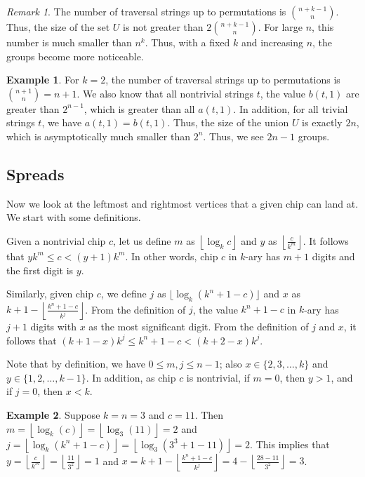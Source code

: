 \documentclass[11pt]{article}
\theoremstyle{definition}
\newtheorem{example}{Example}
\theoremstyle{remark}
\newtheorem*{remark}{Remark} %
\newcommand{\floor}[1]{\left\lfloor #1 \right\rfloor}
\begin{document}
\begin{remark}
The number of traversal strings up to permutations is $\binom{n+k-1}{n}$. Thus, the size of the set $U$ is not greater than $2\binom{n+k - 1}{n}$. For large $n$, this number is much smaller than $n^k$. Thus, with a fixed $k$ and increasing $n$, the groups become more noticeable.
\end{remark}

\begin{example}
    For $k=2$, the number of traversal strings up to permutations is $\binom{n+1}{n} = n+1$. We also know that all nontrivial strings $t$, the value $b(t,1)$ are greater than $2^{n-1}$, which is greater than all $a(t,1)$. In addition, for all trivial strings $t$, we have $a(t,1)= b(t,1)$. Thus, the size of the union $U$ is exactly $2n$, which is asymptotically much smaller than $2^n$. Thus, we see $2n-1$ groups.
\end{example}


\subsection{Spreads}
\label{sec:spreads}

Now we look at the leftmost and rightmost vertices that a given chip can land at. We start with some definitions. 

Given a nontrivial chip $c$, let us define $m$ as $\floor{\log_k c}$ and $y$ as $\floor{\frac{c}{k^m}}$. It follows that $yk^m \leq c < (y+1)k^m$. In other words, chip $c$ in $k$-ary has $m+1$ digits and the first digit is $y$.
 
Similarly, given chip $c$, we define $j$ as $\lfloor \log_k(k^n+1-c)\rfloor$ and $x$ as $k+1 - \floor{\frac{k^n+1-c}{k^j}}$. From the definition of $j$, the value $ k^n+1-c$ in $k$-ary has $j+1$ digits with $x$ as the most significant digit. From the definition of $j$ and $x$, it follows that $(k +1 - x) k^j\leq k^n+1-c < (k+2 - x)k^j$.

Note that by definition, we have $0 \leq m, j \leq n-1$; also $x \in \{2, 3, \dots, k\}$ and $y \in \{1, 2, \dots, k-1\}$. In addition, as chip $c$ is nontrivial, if $m=0$, then $y>1$, and if $j=0$, then $x < k$.

\begin{example}\label{ex:mjxy}
    Suppose $k=n=3$ and $c = 11$. Then $m = \floor{\log_k(c)} = \floor{\log_3(11)} = 2$ and $j = \floor{\log_k(k^n+1-c)} = \floor{\log_3(3^3+1-11)} = 2$. This implies that $y = \floor{\frac{c}{k^m}} = \floor{\frac{11}{3^2}} = 1$ and $x = k+1 - \floor{\frac{k^n+1-c}{k^j}} = 4- \floor{\frac{28 - 11}{3^2}} = 3$.
\end{example}
\end{document}
